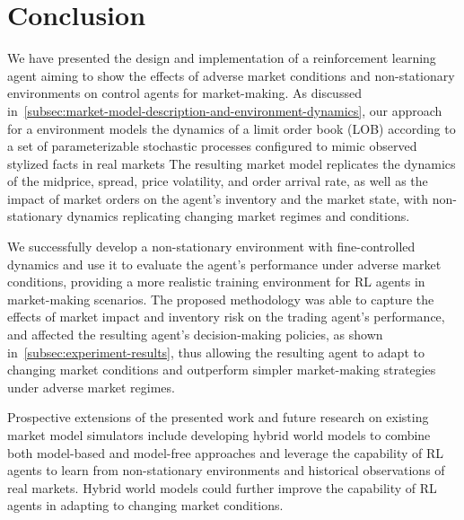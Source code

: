 \section{Conclusion}
\label{sec:conclusion}
We have presented the design and implementation of a reinforcement learning agent aiming to show
the effects of adverse market conditions and non-stationary environments on control agents for market-making.
As discussed in~\autoref{subsec:market-model-description-and-environment-dynamics},
our approach for a environment models the dynamics of a limit order book (LOB)
according to a set of parameterizable stochastic processes configured to mimic observed stylized facts in real markets
The resulting market model replicates the dynamics of the midprice, spread, price volatility, and order arrival rate,
as well as the impact of market orders on the agent's inventory and the market state, with non-stationary dynamics replicating changing market regimes and conditions.

We successfully develop a non-stationary environment with fine-controlled dynamics
and use it to evaluate the agent's performance under adverse market conditions, providing a more realistic training environment for RL agents in market-making scenarios.
The proposed methodology was able to capture the effects of market impact and inventory risk on the trading agent's performance,
and affected the resulting agent's decision-making policies, as shown in~\autoref{subsec:experiment-results}, thus allowing
the resulting agent to adapt to changing market conditions and outperform simpler market-making strategies under adverse market regimes.

Prospective extensions of the presented work and future research on existing market model simulators include
developing hybrid world models to combine both model-based and model-free approaches and leverage the capability of RL agents
to learn from non-stationary environments and historical observations of real markets.
Hybrid world models could further improve the capability of RL agents in adapting to changing market conditions.
